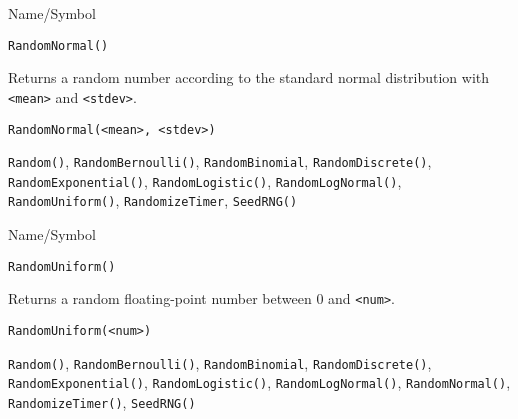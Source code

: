 \rl


\begin{desc}{Name/Symbol}
\item[Name/Symbol] 	\verb+RandomNormal()+

\item[Description] 	Returns a random number according to the standard
             	normal distribution with \verb+<mean>+ and \verb+<stdev>+.

\item[Usage]       	
\begin{verbatim}
RandomNormal(<mean>, <stdev>)
\end{verbatim}

\item[Example]	

\item[See Also]	\verb+Random()+, \verb+RandomBernoulli()+, \verb+RandomBinomial+,
		\verb+RandomDiscrete()+, \verb+RandomExponential()+, \verb+RandomLogistic()+, 
		\verb+RandomLogNormal()+, \verb+RandomUniform()+, \verb+RandomizeTimer+, \verb+SeedRNG()+
\end{desc}

\rl


\begin{desc}{Name/Symbol}
\item[Name/Symbol]	\verb+RandomUniform()+

\item[Description]	Returns a random floating-point number between 0 and \verb+<num>+.

\item[Usage]		
\begin{verbatim}
RandomUniform(<num>)
\end{verbatim}

\item[Example]	

\item[See Also] \verb+Random()+, \verb+RandomBernoulli()+,
  \verb+RandomBinomial+, \verb+RandomDiscrete()+,
  \verb+RandomExponential()+, \verb+RandomLogistic()+,
  \verb+RandomLogNormal()+, \verb+RandomNormal()+, \verb+RandomizeTimer()+,
  \verb+SeedRNG()+
\end{desc}

\rl



